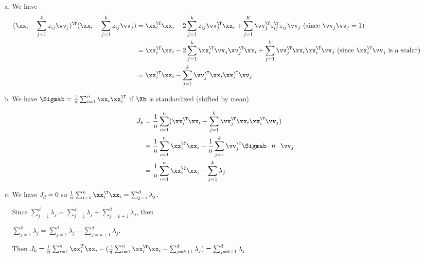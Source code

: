 \documentclass[12pt,letterpaper,fleqn]{hmcpset}
\begin{document}
\begin{solution}
    \begin{enumerate}[(a)]
        \item We have
            \begin{align*}
                (\xx_i - \sum_{j=1}^k z_{ij}\vv_j)^\T(\xx_i - \sum_{j=1}^k z_{ij}\vv_j) &= \xx_i^\T \xx_i - 2\sum_{j=1}^k z_{ij}\vv_j^\T\xx_i + \sum_{j=1}^K \vv_j^\T z_{ij}^\T  z_{ij} \vv_j \text{   (since $\vv_j \vv_j = 1$) } \\
                                                                                        &= \xx_i^\T \xx_i - 2\sum_{j=1}^k \xx_i^\T \vv_j\vv_j^\T\xx_i + \sum_{j=1}^k \vv_j^\T \xx_i \xx_i^\T \vv_j \text{   (since $\xx_i^\T \vv_j$ is a scalar)} \\
                                                                                        &= \xx_i^\T \xx_i - \sum_{j=1}^k \vv_j^\T \xx_i \xx_i^\T \vv_j
            \end{align*}
        \item We have $\Sigmab = \frac{1}{n}\sum_{i=1}^n \xx_i \xx_i^\T$ if $\Xb$ is standardized (shifted by mean)

            \begin{align*}
                J_k &= \frac{1}{n} \sum_{i=1}^n (\xx_i^\T \xx_i - \sum_{j=1}^k \vv_j^\T \xx_i \xx_i^\T \vv_j) \\
                    &= \frac{1}{n} \sum_{i=1}^n \xx_i^\T \xx_i - \frac{1}{n} \sum_{j=1}^k \vv_j^\T \Sigmab \cdot n \cdot \vv_j \\
                    &= \frac{1}{n} \sum_{i=1}^n \xx_i^\T \xx_i - \sum_{j=1}^k \lambda_j
            \end{align*}

        \item We have $J_d = 0$ so $\frac{1}{n} \sum_{i=1}^n \xx_i^\T \xx_i = \sum_{j=1}^d \lambda_j$.

            Since $\sum_{j=1}^d \lambda_j = \sum_{j=1}^k \lambda_j + \sum_{j=k+1}^d \lambda_j$, then 

            $\sum_{j=1}^k \lambda_j = \sum_{j=1}^d \lambda_j - \sum_{j=k+1}^d \lambda_j$.

            Then $J_k = \frac{1}{n} \sum_{i=1}^n \xx_i^T \xx_i - (\frac{1}{n} \sum_{i=1}^n \xx_i^\T \xx_i - \sum_{j=k+1}^d \lambda_j) = \sum_{j=k+1}^d \lambda_j$
    \end{enumerate}
\end{solution}
\newpage
\end{document}
